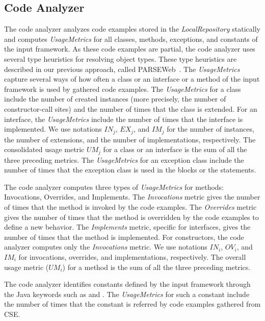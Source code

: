 \subsection{Code Analyzer} 
The code analyzer analyzes code examples 
stored in the \emph{LocalRepository} statically and computes
\emph{UsageMetrics} for all classes, methods, exceptions, and constants of the input
framework. As these code examples are partial,
the code analyzer uses several type heuristics for resolving object types.
These type heuristics are described in our previous approach, called PARSEWeb~\cite{thummalapenta07:parseweb}.
The \emph{UsageMetrics} capture several ways of how often a class or an interface or a method 
of the input framework is used by gathered code examples.
The \emph{UsageMetrics} for a class include the
number of created instances (more precisely, the number of
constructor-call sites) and the number of times that the class is
extended. For an interface, the \emph{UsageMetrics} include the number
of times that the interface is implemented. We use notations
$IN_j$, $EX_j$, and $IM_j$ for the number of instances,
the number of extensions, and the number of implementations, respectively.
The consolidated usage metric $UM_j$ for a class or an interface 
is the sum of all the three preceding metrics. The \emph{UsageMetrics}
for an exception class include the number of times that the exception class
is used in the  blocks or the  statements. 

The code analyzer computes three types of \emph{UsageMetrics} for
methods: Invocations, Overrides, and Implements.
The \emph{Invocations} metric gives the number of times that the
method is invoked by the code examples. The \emph{Overrides} metric
gives the number of times that the method is overridden by the code
examples to define a new behavior. The \emph{Implements} metric,
specific for interfaces, gives the number of times that the method
is implemented.  
For constructors, the code analyzer computes only the \emph{Invocations} metric. 
We use notations $IN_i$, $OV_i$, and $IM_i$
for invocations, overrides, and implementations, respectively. 
The overall usage metric ($UM_i$) for a method is the sum of all the three
preceding metrics. 

The code analyzer identifies constants defined by the input framework through
the Java keywords such as  and . The \emph{UsageMetrics}
for such a constant include the number of times that the constant is referred
by code examples gathered from CSE.

